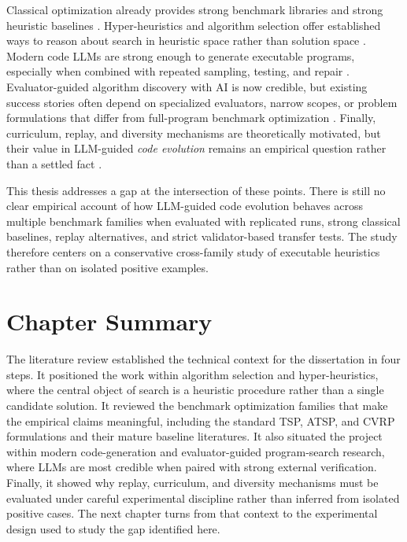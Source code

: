 Classical optimization already provides strong benchmark libraries and strong heuristic baselines
\cite{reinelt1991,lin1973,helsgaun2000,clarke1964,uchoa2017,vidal2022hgs}. Hyper-heuristics and
algorithm selection offer established ways to reason about search in heuristic space rather than
solution space \cite{rice1976,burke2013,dokeroglu2024}. Modern code LLMs are strong enough to
generate executable programs, especially when combined with repeated sampling, testing, and repair
\cite{chen2021codex,austin2021program,li2022alphacode,jain2024livecodebench}. Evaluator-guided
algorithm discovery with AI is now credible, but existing success stories often depend on
specialized evaluators, narrow scopes, or problem formulations that differ from full-program
benchmark optimization \cite{mankowitz2023alphadev,romeraparedes2024funsearch,liu2023lmea}.
Finally, curriculum, replay, and diversity mechanisms are theoretically motivated, but their value
in LLM-guided \emph{code evolution} remains an empirical question rather than a settled fact
\cite{bengio2009curriculum,schaul2015prioritized,pugh2016qd}.

This thesis addresses a gap at the intersection of these points. There is still no clear
empirical account of how LLM-guided code evolution behaves across multiple benchmark families when
evaluated with replicated runs, strong classical baselines, replay alternatives, and strict
validator-based transfer tests. The study therefore centers on a conservative cross-family
study of executable heuristics rather than on isolated positive examples.

\section{Chapter Summary}
\label{sec:lit-summary}

The literature review established the technical context for the dissertation in four steps. It
positioned the work within algorithm selection and hyper-heuristics, where the central object of search is a
heuristic procedure rather than a single candidate solution. It reviewed the benchmark optimization
families that make the empirical claims meaningful, including the standard TSP, ATSP, and CVRP
formulations and their mature baseline literatures. It also situated the project within modern
code-generation and evaluator-guided program-search research, where LLMs are most credible when
paired with strong external verification. Finally, it showed why replay, curriculum, and diversity
mechanisms must be evaluated under careful experimental discipline rather than inferred from
isolated positive cases. The next chapter turns from that context to the experimental design used
to study the gap identified here.
